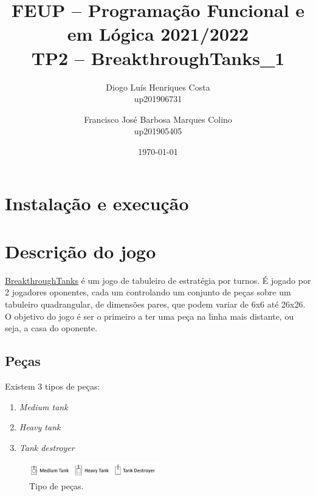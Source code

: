 \documentclass[a4paper,11pt,portuguese]{article}
\begin{document}

\author{
    Diogo Luís Henriques Costa\\
    up201906731
    \and
    Francisco José Barbosa Marques Colino\\
    up201905405
}
\title{FEUP -- Programação Funcional e em Lógica \large 2021/2022 \\ \large TP2 -- BreakthroughTanks\_1}
\date{\today}
\maketitle


\section{Instalação e execução}



\section{Descrição do jogo}

\href{https://boardgamegeek.com/boardgame/321224/breakthrough-tanks}{BreakthroughTanks}
é um jogo de tabuleiro de estratégia por turnos. É jogado por 2 jogadores oponentes, cada 
um controlando um conjunto de peças sobre um tabuleiro quadrangular, de dimensões pares, que podem variar
de 6x6 até 26x26. O objetivo do jogo é ser o primeiro a ter uma peça na linha mais distante, ou seja, a casa do oponente. 

\subsection{Peças}

\noindent Existem 3 tipos de peças:

\begin{enumerate}[topsep=4pt,itemsep=2pt]
    \item \textit{Medium tank}
    \item \textit{Heavy tank}
    \item \textit{Tank destroyer}
\end{enumerate}

\begin{figure}[H]
    \centering
    \includegraphics[width=0.5\textwidth]{imgs/pecas.png}
    \caption{Tipo de peças.}
    \label{fig:pecas}
\end{figure}
\end{document}
